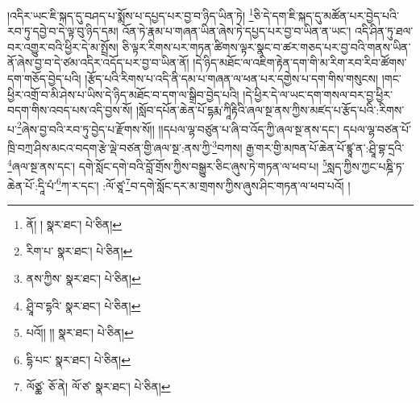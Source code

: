 །འདིར་ཡང་ཇི་སྐད་དུ་བཤད་པ་སྨོས་པ་དཔྱད་པར་བྱ་བ་ཉིད་ཡིན་ཏེ། \footnote{ནོ། །   སྣར་ཐང་།  པེ་ཅིན། }ཅི་དེ་དག་ཇི་སྐད་དུ་མཚོན་པར་བྱེད་པའི་རབ་ཏུ་དབྱེ་བ་དེ་ལྟ་བུ་ཉིད་དམ། འོན་ཏེ་རྣམ་པ་གཞན་ཡིན་ཞེས་ཏེ་དཔྱད་པར་བྱ་བ་ཡིན་ན་ཡང་། འདི་ཤིན་ཏུ་ཐལ་བར་འགྱུར་བའི་ཕྱིར་དེ་མ་སྤྲོས། ཅི་ལྟར་རིགས་པར་གཏན་ཚིགས་ལྟར་སྣང་བ་ཚར་གཅད་པར་བྱ་བའི་གནས་ཡིན་ནོ་ཞེས་བྱ་བ་དེ་ཙམ་འདིར་འདོད་པར་བྱ་བ་ཡིན་ནོ། །དེ་ཉིད་མཐོང་ལ་འཇིག་རྟེན་དག་གི་མ་རིག་རབ་རིབ་ཚོགས་དག་གཅོད་བྱེད་པའི། །རྩོད་པའི་རིགས་པ་འདི་ནི་དམ་པ་གཞན་ལ་ཕན་པར་དགྱེས་པ་དག་གིས་གསུངས། །གང་ཕྱིར་འགྲོ་བ་མི་ཤེས་པ་ཡིས་དེ་ཉིད་མཐོང་བ་དག་ལ་སྒྲིབ་བྱེད་པའི། །དེ་ཕྱིར་དེ་ལ་ཡང་དག་གསལ་བར་བྱ་ཕྱིར་བདག་གིས་འབད་པས་འདི་བྱས་སོ། །སློབ་དཔོན་ཆེན་པོ་དྷརྨ་ཀཱིརྟིའི་ཞལ་སྔ་ནས་ཀྱིས་མཛད་པ་རྩོད་པའི་:རིགས་པ་\footnote{རིག་པ་  སྣར་ཐང་།  པེ་ཅིན། }ཞེས་བྱ་བའི་རབ་ཏུ་བྱེད་པ་རྫོགས་སོ།། །།དཔལ་ལྷ་བཙུན་པ་ཞི་བ་འོད་ཀྱི་ཞལ་སྔ་ནས་དང་། དཔལ་ལྷ་བཙན་པོ་ཁྲི་བཀྲ་ཤིས་མངའ་བདག་རྩེ་ལྡེ་བཙན་གྱི་ཞལ་སྔ་:ནས་ཀྱི་\footnote{ནས་ཀྱིས་  སྣར་ཐང་།  པེ་ཅིན། }བཀས། རྒྱ་གར་གྱི་མཁན་པོ་ཆེན་པོ་ཛྙཱ་ན་:ཤྲཱི་བྷ་དྲའི་\footnote{ཤྲཱི་བ་དྷའི་  སྣར་ཐང་།  པེ་ཅིན། }ཞལ་སྔ་ནས་དང་། དགེ་སློང་དགེ་བའི་བློ་གྲོས་ཀྱིས་བསྒྱུར་ཅིང་ཞུས་ཏེ་གཏན་ལ་ཕབ་པ། \footnote{པའོ།། །།   སྣར་ཐང་།  པེ་ཅིན། }སླད་ཀྱིས་ཀྱང་པཎྜི་ཏ་ཆེན་པོ་:དཱི་པཾ་\footnote{དྷི་པང་  སྣར་ཐང་།  པེ་ཅིན། }ཀ་ར་དང་། :ལོ་ཙཱ་\footnote{ལོཙྪ་  ཅོ་ནེ། ལོ་ཙ་  སྣར་ཐང་།  པེ་ཅིན། }བ་དགེ་སློང་དར་མ་གྲགས་ཀྱིས་ཞུས་ཤིང་གཏན་ལ་ཕབ་པའོ། ། 